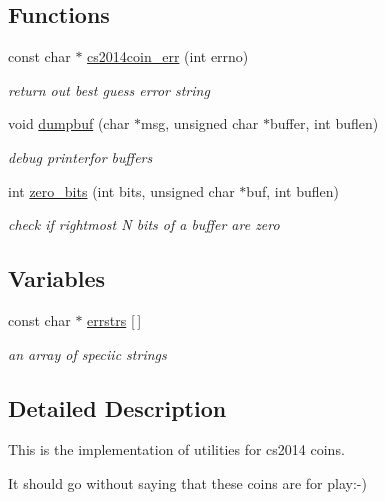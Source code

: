 \subsection*{Functions}
\begin{DoxyCompactItemize}
\item 
const char $\ast$ \hyperlink{cs2014coin-util_8c_af955b20ed8c88563e864ecca0b2e538e}{cs2014coin\+\_\+err} (int errno)
\begin{DoxyCompactList}\small\item\em return out best guess error string \end{DoxyCompactList}\item 
void \hyperlink{cs2014coin-util_8c_afd151090a1b9f8e9a800daa05be4bbf6}{dumpbuf} (char $\ast$msg, unsigned char $\ast$buffer, int buflen)
\begin{DoxyCompactList}\small\item\em debug printerfor buffers \end{DoxyCompactList}\item 
int \hyperlink{cs2014coin-util_8c_a703c5c765e9038368f07fa48d3a89934}{zero\+\_\+bits} (int bits, unsigned char $\ast$buf, int buflen)
\begin{DoxyCompactList}\small\item\em check if rightmost N bits of a buffer are zero \end{DoxyCompactList}\end{DoxyCompactItemize}
\subsection*{Variables}
\begin{DoxyCompactItemize}
\item 
const char $\ast$ \hyperlink{cs2014coin-util_8c_a8e3da0eb987e1e7cd239012fe8d18655}{errstrs} \mbox{[}$\,$\mbox{]}
\begin{DoxyCompactList}\small\item\em an array of speciic strings \end{DoxyCompactList}\end{DoxyCompactItemize}


\subsection{Detailed Description}
This is the implementation of utilities for cs2014 coins. 

It should go without saying that these coins are for play\+:-\/)

